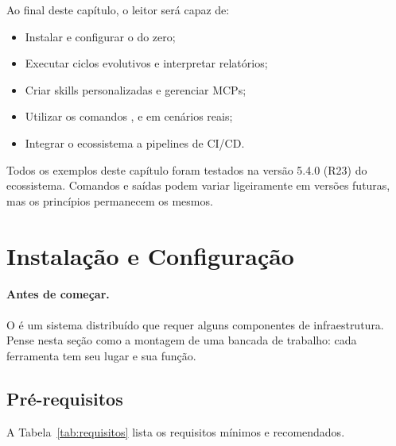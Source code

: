 \noindent Ao final deste capítulo, o leitor será capaz de:
\begin{itemize}
\item Instalar e configurar o \opencodeeco{} do zero;
\item Executar ciclos evolutivos e interpretar relatórios;
\item Criar skills personalizadas e gerenciar MCPs;
\item Utilizar os comandos ,  e
       em cenários reais;
\item Integrar o ecossistema a pipelines de CI/CD.
\end{itemize}

\begin{observacao}
Todos os exemplos deste capítulo foram testados na versão 5.4.0 (R23)
do ecossistema. Comandos e saídas podem variar ligeiramente em versões
futuras, mas os princípios permanecem os mesmos.
\end{observacao}

\section{Instalação e Configuração}
\label{sec:instalacao}
\nivelzero

\paragraph{Antes de começar.} O \opencodeeco{} é um sistema distribuído que
requer alguns componentes de infraestrutura. Pense nesta seção como a
montagem de uma bancada de trabalho: cada ferramenta tem seu lugar e sua
função.

\subsection{Pré-requisitos}
\label{subsec:requisitos}

A Tabela~\ref{tab:requisitos} lista os requisitos mínimos e recomendados.

